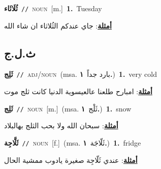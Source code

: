 \documentclass[10pt,a4paper,twoside]{article} %
\begin{document}
\begin{multicols}{2}
{\setlength\topsep{0pt}\textbf{\foreignlanguage{arabic}{ثُلَاثَاء}}\ {\color{gray}\texttt{//}\color{black}}\ \textsc{noun}\ [m.]\ \textbf{1.}~Tuesday\  \begin{flushright}\color{gray}\foreignlanguage{arabic}{\textbf{\underline{\foreignlanguage{arabic}{أمثلة}}}: جاي عندكم الثُلاثاء ان شاء الله}\end{flushright}\color{black}} \vspace{2mm}

\vspace{-3mm}
\subsection*{\color{blue}\foreignlanguage{arabic}{ث.ل.ج}\color{blue}{}} 

{\setlength\topsep{0pt}\textbf{\foreignlanguage{arabic}{ثَلِج}}\ {\color{gray}\texttt{//}\color{black}}\ \textsc{adj/noun}\ \color{gray}(msa. \foreignlanguage{arabic}{بارد جداً}~\foreignlanguage{arabic}{\textbf{١.}})\color{black}\ \textbf{1.}~very cold\  \begin{flushright}\color{gray}\foreignlanguage{arabic}{\textbf{\underline{\foreignlanguage{arabic}{أمثلة}}}: امبارح طلعنا عالعيسوية الدنيا كانت ثلج موت}\end{flushright}\color{black}} \vspace{2mm}

{\setlength\topsep{0pt}\textbf{\foreignlanguage{arabic}{ثَلِج}}\ {\color{gray}\texttt{//}\color{black}}\ \textsc{noun}\ [m.]\ \color{gray}(msa. \foreignlanguage{arabic}{ثَلْج}~\foreignlanguage{arabic}{\textbf{١.}})\color{black}\ \textbf{1.}~snow\  \begin{flushright}\color{gray}\foreignlanguage{arabic}{\textbf{\underline{\foreignlanguage{arabic}{أمثلة}}}: سبحان الله ولا بحب الثلج بهالبلاد}\end{flushright}\color{black}} \vspace{2mm}

{\setlength\topsep{0pt}\textbf{\foreignlanguage{arabic}{ثَلَّاجِة}}\ {\color{gray}\texttt{//}\color{black}}\ \textsc{noun}\ [f.]\ \color{gray}(msa. \foreignlanguage{arabic}{ثَلّاجَة}~\foreignlanguage{arabic}{\textbf{١.}})\color{black}\ \textbf{1.}~fridge\  \begin{flushright}\color{gray}\foreignlanguage{arabic}{\textbf{\underline{\foreignlanguage{arabic}{أمثلة}}}: عندي ثَلّاجِة صغيرة يادوب ممشية الحال}\end{flushright}\color{black}} \vspace{2mm}


\end{multicols}
\end{document}
